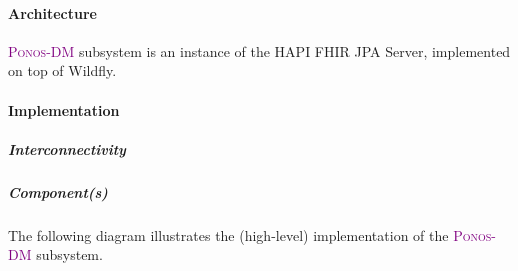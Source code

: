 \documentclass[a4paper]{book}
\newcommand{\ponosdm}{\textsc{\textcolor{Purple}{\small{Ponos-DM }}}}
\begin{document}
\paragraph{Architecture}

\ponosdm subsystem is an instance of the HAPI FHIR JPA Server, implemented on top of Wildfly.

\paragraph{Implementation}

\subparagraph{Interconnectivity}

\subparagraph{Component(s)}

The following diagram illustrates the (high-level) implementation of the \ponosdm subsystem.
\end{document}
